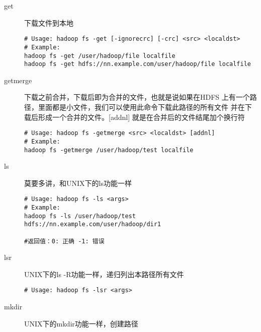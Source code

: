 \documentclass{article}
\begin{document}
\begin{description}
\item[get] 下载文件到本地

\begin{verbatim}
# Usage: hadoop fs -get [-ignorecrc] [-crc] <src> <localdst>
# Example: 
hadoop fs -get /user/hadoop/file localfile
hadoop fs -get hdfs://nn.example.com/user/hadoop/file localfile
\end{verbatim}

\item[getmerge] 下载之前合并，下载后即为合并的文件，也就是说如果在HDFS
上有一个路径，里面都是小文件，我们可以使用此命令下载此路径的所有文件
并在下载后形成一个合并的文件。[addnl] 就是在合并后的文件结尾加个换行符

\begin{verbatim}
# Usage: hadoop fs -getmerge <src> <localdst> [addnl]
# Example: 
hadoop fs -getmerge /user/hadoop/test localfile
\end{verbatim}

\item[ls] 莫要多讲，和UNIX下的ls功能一样

\begin{verbatim}
# Usage: hadoop fs -ls <args>
# Example: 
hadoop fs -ls /user/hadoop/test hdfs://nn.example.com/user/hadoop/dir1

#返回值：0: 正确 -1: 错误
\end{verbatim}


\item[lsr] UNIX下的ls -R功能一样，递归列出本路径所有文件

\begin{verbatim}
# Usage: hadoop fs -lsr <args>
\end{verbatim}

\item[mkdir] UNIX下的mkdir功能一样，创建路径


\end{description}
\end{document}
